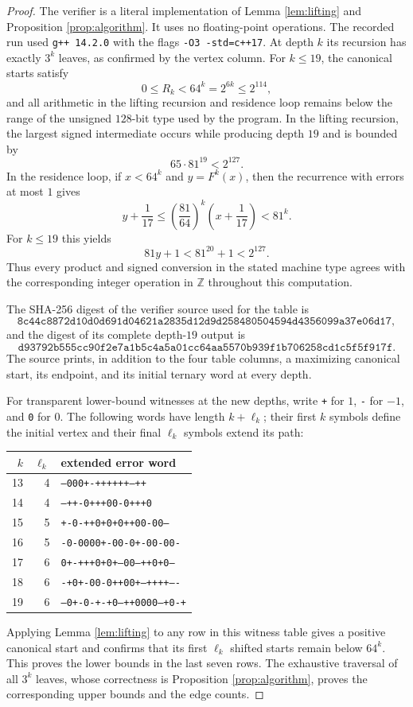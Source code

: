 \documentclass[11pt]{article}
\theoremstyle{definition}
\theoremstyle{remark}
\newcommand{\Z}{\mathbb{Z}}
\begin{document}
\begin{proof}
The verifier is a literal implementation of Lemma \ref{lem:lifting} and Proposition \ref{prop:algorithm}. It uses no floating-point operations. The recorded run used \texttt{g++ 14.2.0} with the flags \texttt{-O3 -std=c++17}. At depth $k$ its recursion has exactly $3^k$ leaves, as confirmed by the vertex column. For $k\le19$, the canonical starts satisfy
\[
0\le R_k<64^k=2^{6k}\le2^{114},
\]
and all arithmetic in the lifting recursion and residence loop remains below the range of the unsigned $128$-bit type used by the program. In the lifting recursion, the largest signed intermediate occurs while producing depth $19$ and is bounded by
\[
65\cdot81^{19}<2^{127}.
\]
In the residence loop, if $x<64^k$ and $y=F^k(x)$, then the recurrence with errors at most $1$ gives
\[
y+\frac1{17}
\le
\left(\frac{81}{64}\right)^k
\left(x+\frac1{17}\right)
<81^k.
\]
For $k\le19$ this yields
\[
81y+1<81^{20}+1<2^{127}.
\]
Thus every product and signed conversion in the stated machine type agrees with the corresponding integer operation in $\Z$ throughout this computation.

The SHA-256 digest of the verifier source used for the table is
\[
\texttt{8c44c8872d10d0d691d04621a2835d12d9d258480504594d4356099a37e06d17},
\]
and the digest of its complete depth-$19$ output is
\[
\texttt{d93792b555cc90f2e7a1b5c4a5a01cc64aa5570b939f1b706258cd1c5f5f917f}.
\]
The source prints, in addition to the four table columns, a maximizing canonical start, its endpoint, and its initial ternary word at every depth.

For transparent lower-bound witnesses at the new depths, write \texttt{+} for $1$, \texttt{-} for $-1$, and \texttt{0} for $0$. The following words have length $k+\ell_k$; their first $k$ symbols define the initial vertex and their final $\ell_k$ symbols extend its path:
\begin{center}
\begin{tabular}{r|r|l}
$k$ & $\ell_k$ & extended error word\\ \hline
13 & 4 & \texttt{--000+-++++++--++}\\
14 & 4 & \texttt{---++-0+++00-0+++0}\\
15 & 5 & \texttt{+-0-++0+0+0++00-00--}\\
16 & 5 & \texttt{-0-0000+-00-0+-00-00-}\\
17 & 6 & \texttt{0+-+++0+0+--00--++0+0--}\\
18 & 6 & \texttt{-+0+-00-0++00+--++++----}\\
19 & 6 & \texttt{--0+-0-+-+0--++0000--+0-+}
\end{tabular}
\end{center}
Applying Lemma \ref{lem:lifting} to any row in this witness table gives a positive canonical start and confirms that its first $\ell_k$ shifted starts remain below $64^k$. This proves the lower bounds in the last seven rows. The exhaustive traversal of all $3^k$ leaves, whose correctness is Proposition \ref{prop:algorithm}, proves the corresponding upper bounds and the edge counts.


\end{proof}
\end{document}
